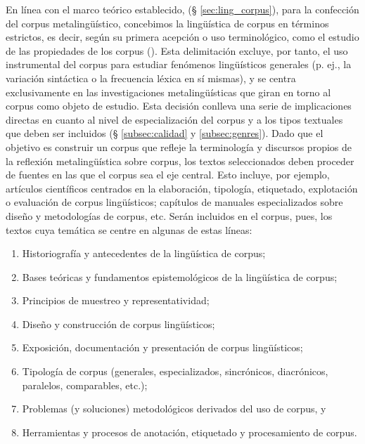 En línea con el marco teórico establecido, (§ \ref{sec:ling_corpus}), para la confección del corpus metalingüístico, concebimos la lingüística de corpus en términos estrictos, es decir, según su primera acepción o uso terminológico, como el estudio de las propiedades de los corpus (\cite{Gries2011}). Esta delimitación excluye, por tanto, el uso instrumental del corpus para estudiar fenómenos lingüísticos generales (p. ej., la variación sintáctica o la frecuencia léxica en sí mismas), y se centra exclusivamente en las investigaciones metalingüísticas que giran en torno al corpus como objeto de estudio. Esta decisión conlleva una serie de implicaciones directas en cuanto al nivel de especialización del corpus y a los tipos textuales que deben ser incluidos (§ \ref{subsec:calidad} y \ref{subsec:genres}). Dado que el objetivo es construir un corpus que refleje la terminología y discursos propios de la reflexión metalingüística sobre corpus, los textos seleccionados deben proceder de fuentes en las que el corpus sea el eje central. Esto incluye, por ejemplo, artículos científicos centrados en la elaboración, tipología, etiquetado, explotación o evaluación de corpus lingüísticos; capítulos de manuales especializados sobre diseño y metodologías de corpus, etc. Serán incluidos en el corpus, pues, los textos cuya temática se centre en algunas de estas líneas:

\begin{enumerate}
    \item Historiografía y antecedentes de la lingüística de corpus;
    \item Bases teóricas y fundamentos epistemológicos de la lingüística de corpus;
    \item Principios de muestreo y representatividad;
    \item Diseño y construcción de corpus lingüísticos;
    \item Exposición, documentación y presentación de corpus lingüísticos;
    \item Tipología de corpus (generales, especializados, sincrónicos, diacrónicos, paralelos, comparables, etc.);
    \item Problemas (y soluciones) metodológicos derivados del uso de corpus, y
    \item Herramientas y procesos de anotación, etiquetado y procesamiento de corpus.  

\end{enumerate}

